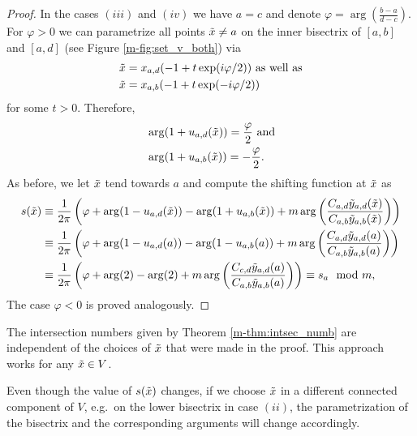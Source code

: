 \documentclass[main.tex]{subfiles}
\begin{document}
\begin{proof}
  In the cases $(iii)$ and $(iv)$ we have $a = c$ and denote $\varphi =  \arg \left( \frac{b-a}{d-c} \right)$. For $\varphi > 0$ we can parametrize all points $\tilde{x} \ne a$ on the inner
  bisectrix of $[a,b]$ and $[a,d]$ (see Figure \ref{m-fig:set_v_both}) via
 \begin{align*}
  \tilde{x} & = x_{a,d}(-1+t \exp(i \varphi /2)) \text{  as well as} \\
  \tilde{x} & = x_{a,b}(-1+t \exp(-i \varphi/2))
 \end{align*}
 for some $t > 0$. Therefore,
 \begin{align*}
   & \arg (1+u_{a,d}(\tilde{x})) = \frac{\varphi}{2} \text{ and} \\
   & \arg (1+u_{a,b}(\tilde{x})) = -\frac{\varphi}{2}.
 \end{align*}
 As before, we let $\tilde{x}$ tend towards $a$ and compute the shifting function at $\tilde{x}$ as
 \begin{align*}
  s(\tilde{x}) & \equiv \frac{1}{2\pi} \left( \varphi + \arg(1-u_{a,d}(\tilde{x})) - \arg(1+u_{a,b}(\tilde{x})) +  m \arg \left( \frac{ C_{a,d} \tilde{y}_{a,d}(\tilde{x})}{C_{a,b}\tilde{y}_{a,b}(\tilde{x})} \right)\right) \\
	 & \equiv \frac{1}{2\pi} \left ( \varphi +\arg(1-u_{a,d}(a)) - \arg(1-u_{a,b}(a)) +  m \arg \left( \frac{ C_{a,d} \tilde{y}_{a,d}(a)}{C_{a,b}\tilde{y}_{a,b}(a)} \right)\right) \\
	 & \equiv \frac{1}{2\pi} \left( \varphi +\arg(2) - \arg(2) +  m \arg \left( \frac{ C_{c,d} \tilde{y}_{a,d}(a)}{C_{a,b}\tilde{y}_{a,b}(a)} \right)\right) \equiv s_a \mod m,
 \end{align*}
 The case $\varphi < 0$ is proved analogously.
\end{proof} 

\begin{rmk}
  The intersection numbers given by Theorem \ref{m-thm:intsec_numb} are independent of the choices of $\tilde{x}$ that were made in the proof. This approach works for any $\tilde{x} \in V$.
  
  Even though the value of
  $s(\tilde{x})$ changes, if we choose $\tilde{x}$ in a different connected component of $V$, e.g.\ on the lower bisectrix in case $(ii)$,  
  the parametrization of the bisectrix and the corresponding arguments will change accordingly.
\end{rmk}
\end{document}
